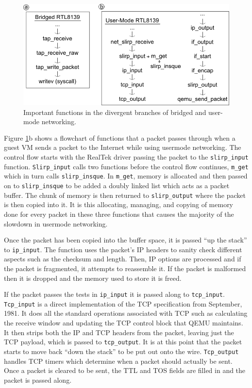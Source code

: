 \begin{figure}[!ht]
	\centering
		\includegraphics[scale=0.6]{codepath2_alt}
	\caption{Important functions in the divergent branches of bridged and user-mode networking.}
	\label{fig:codepath2}
\end{figure}

Figure \ref{fig:codepath2}b shows a flowchart of functions that a packet passes through when a guest VM sends a packet to the Internet while using usermode networking.
The control flow starts with the RealTek driver passing the packet to the \texttt{slirp\_input} function.
\texttt{Slirp\_input} calls two functions before the control flow continues, \texttt{m\_get} which in turn calls \texttt{slirp\_insque}.
In \texttt{m\_get}, memory is allocated and then passed on to \texttt{slirp\_insque} to be added a doubly linked list which acts as a packet buffer.
The chunk of memory is then returned to \texttt{slirp\_output} where the packet is then copied into it. %
It is this allocating, managing, and copying of memory done for every packet in these three functions that causes the majority of the slowdown in usermode networking.

Once the packet has been copied into the buffer space, it is passed ``up the stack'' to \texttt{ip\_input}. 
The function uses the packet's IP headers to sanity check different aspects such as the checksum and length.
Then, IP options are processed and if the packet is fragmented, it attempts to reassemble it.
If the packet is malformed then it is dropped and the memory used to store it is freed.

If the packet passes the tests in \texttt{ip\_input} it is passed along to \texttt{tcp\_input}.
\texttt{Tcp\_input} is a direct implementation of the TCP specification from September, 1981.
It does all the standard operations associated with TCP such as calculating the receive window and updating the TCP control block that QEMU maintains.
It then strips both the IP and TCP headers from the packet, leaving just the TCP payload, which is passed to \texttt{tcp\_output}.
It is at this point that the packet starts to move back ``down the stack'' to be put out onto the wire.
\texttt{Tcp\_output} handles TCP timers which determine when a packet should actually be sent.
Once a packet is cleared to be sent, the TTL and TOS fields are filled in and the packet is passed along.

